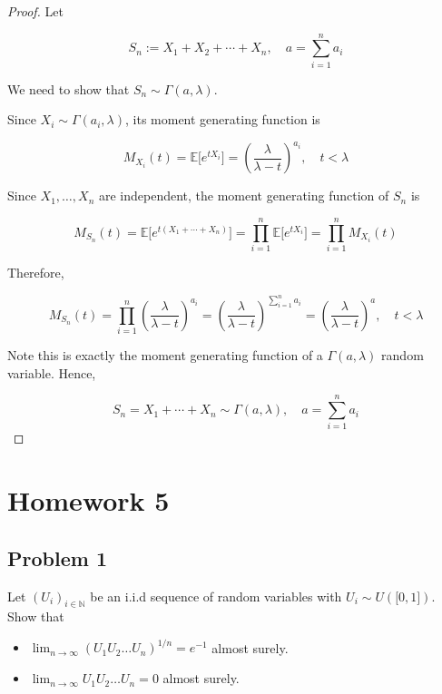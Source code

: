\documentclass{qlnotes-export}
\begin{document}
\begin{proof}

Let

\[S_{n} := X_{1} + X_{2} + \cdots + X_{n},\quad a = \sum\limits_{i = 1}^{n}a_{i}\]

We need to show that \(S_{n} \sim \Gamma(a,\lambda)\).

Since \(X_{i} \sim \Gamma(a_{i},\lambda)\), its moment generating function is

\[M_{X_{i}}(t) = {\mathbb{E}}\lbrack e^{tX_{i}}\rbrack = \left( \frac{\lambda}{\lambda - t} \right)^{a_{i}},\quad t < \lambda\]

Since \(X_{1},\ldots,X_{n}\) are independent, the moment generating function of \(S_{n}\) is

\[M_{S_{n}}(t) = {\mathbb{E}}\lbrack e^{t(X_{1} + \cdots + X_{n})}\rbrack = \prod\limits_{i = 1}^{n}{\mathbb{E}}\lbrack e^{tX_{i}}\rbrack = \prod\limits_{i = 1}^{n}M_{X_{i}}(t)\]

Therefore,

\[M_{S_{n}}(t) = \prod\limits_{i = 1}^{n}\left( \frac{\lambda}{\lambda - t} \right)^{a_{i}} = \left( \frac{\lambda}{\lambda - t} \right)^{\sum_{i = 1}^{n}a_{i}} = \left( \frac{\lambda}{\lambda - t} \right)^{a},\quad t < \lambda\]

Note this is exactly the moment generating function of a \(\Gamma(a,\lambda)\) random variable. Hence,

\[S_{n} = X_{1} + \cdots + X_{n} \sim \Gamma(a,\lambda),\quad a = \sum\limits_{i = 1}^{n}a_{i}\]

\end{proof}

\chapter{Homework 5}\label{homework-5}

\section{Problem 1}\label{problem-1-5}

Let \(\left( U_{i} \right)_{i \in {\mathbb{N}}}\) be an i.i.d sequence of random variables with \(U_{i} \sim U(\lbrack 0,1\rbrack)\). Show that

\begin{itemize}
\item
  \(\lim_{n\rightarrow\infty}\left( {U_{1}U_{2}\ldots U_{n}} \right)^{1/n} = e^{- 1}\) almost surely.
\item
  \(\lim_{n\rightarrow\infty}U_{1}U_{2}\ldots U_{n} = 0\) almost surely.
\end{itemize}
\end{document}
